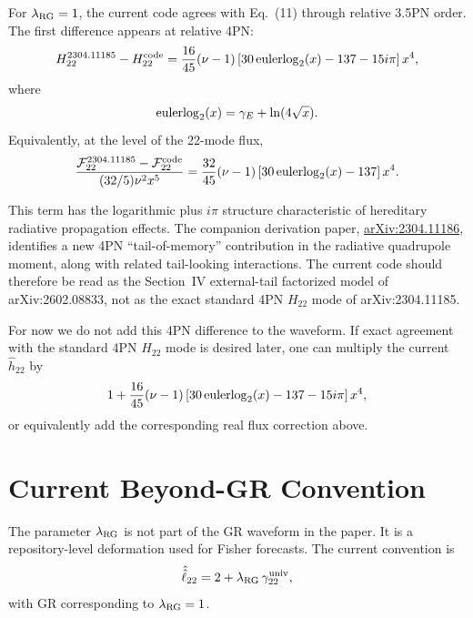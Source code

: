 \documentclass[11pt]{article}
\begin{document}
For \(\lambda_{\rm RG}=1\), the current code agrees with
Eq.~(11) through relative 3.5PN order. The first difference appears at
relative 4PN:
\begin{equation}
  H_{22}^{2304.11185} - H_{22}^{\rm code}
  =
  \frac{16}{45}(\nu-1)
  \left[
    30\,{\rm eulerlog}_2(x)-137-15i\pi
  \right]x^4,
\end{equation}
where
\begin{equation}
  {\rm eulerlog}_2(x)
  =
  \gamma_E+\ln(4\sqrt{x}).
\end{equation}
Equivalently, at the level of the 22-mode flux,
\begin{equation}
  \frac{
    \mathcal F_{22}^{2304.11185}
    -
    \mathcal F_{22}^{\rm code}
  }{
    (32/5)\nu^2x^5
  }
  =
  \frac{32}{45}(\nu-1)
  \left[
    30\,{\rm eulerlog}_2(x)-137
  \right]x^4.
\end{equation}

This term has the logarithmic plus \(i\pi\) structure characteristic of
hereditary radiative propagation effects. The companion derivation paper,
\href{https://arxiv.org/abs/2304.11186}{arXiv:2304.11186}, identifies a new
4PN ``tail-of-memory'' contribution in the radiative quadrupole moment, along
with related tail-looking interactions. The current code should therefore be
read as the Section~IV external-tail factorized model of arXiv:2602.08833, not
as the exact standard 4PN \(H_{22}\) mode of arXiv:2304.11185.

For now we do not add this 4PN difference to the waveform. If exact agreement
with the standard 4PN \(H_{22}\) mode is desired later, one can multiply the
current \(\hat h_{22}\) by
\begin{equation}
  1+
  \frac{16}{45}(\nu-1)
  \left[
    30\,{\rm eulerlog}_2(x)-137-15i\pi
  \right]x^4,
\end{equation}
or equivalently add the corresponding real flux correction above.

\section{Current Beyond-GR Convention}

The parameter \(\lambda_{\rm RG}\) is not part of the GR waveform in the paper.
It is a repository-level deformation used for Fisher forecasts. The current
convention is
\begin{equation}
  \hat{\hat \ell}_{22}
  =
  2 + \lambda_{\rm RG}\,\gamma^{\rm univ}_{22},
\end{equation}
with GR corresponding to \(\lambda_{\rm RG}=1\).
\end{document}
